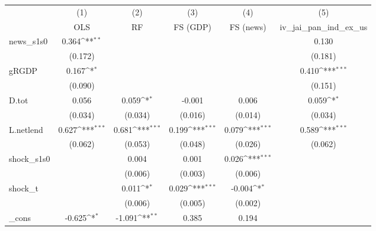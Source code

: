 {
\def\sym#1{\ifmmode^{#1}\else\(^{#1}\)\fi}
\begin{tabular}{l*{5}{c}}
\toprule
            &\multicolumn{1}{c}{(1)}&\multicolumn{1}{c}{(2)}&\multicolumn{1}{c}{(3)}&\multicolumn{1}{c}{(4)}&\multicolumn{1}{c}{(5)}\\
            &\multicolumn{1}{c}{OLS}&\multicolumn{1}{c}{RF}&\multicolumn{1}{c}{FS (GDP)}&\multicolumn{1}{c}{FS (news)}&\multicolumn{1}{c}{iv\_jai\_pan\_ind\_ex\_us}\\
\midrule
news\_s1s0   &       0.364\sym{**} &                     &                     &                     &       0.130         \\
            &     (0.172)         &                     &                     &                     &     (0.181)         \\
\addlinespace
gRGDP       &       0.167\sym{*}  &                     &                     &                     &       0.410\sym{***}\\
            &     (0.090)         &                     &                     &                     &     (0.151)         \\
\addlinespace
D.tot       &       0.056         &       0.059\sym{*}  &      -0.001         &       0.006         &       0.059\sym{*}  \\
            &     (0.034)         &     (0.034)         &     (0.016)         &     (0.014)         &     (0.034)         \\
\addlinespace
L.netlend   &       0.627\sym{***}&       0.681\sym{***}&       0.199\sym{***}&       0.079\sym{***}&       0.589\sym{***}\\
            &     (0.062)         &     (0.053)         &     (0.048)         &     (0.026)         &     (0.062)         \\
\addlinespace
shock\_s1s0  &                     &       0.004         &       0.001         &       0.026\sym{***}&                     \\
            &                     &     (0.006)         &     (0.003)         &     (0.006)         &                     \\
\addlinespace
shock\_t     &                     &       0.011\sym{*}  &       0.029\sym{***}&      -0.004\sym{*}  &                     \\
            &                     &     (0.006)         &     (0.005)         &     (0.002)         &                     \\
\addlinespace
\_cons      &      -0.625\sym{*}  &      -1.091\sym{**} &       0.385         &       0.194         &                     \\

\end{tabular}}
